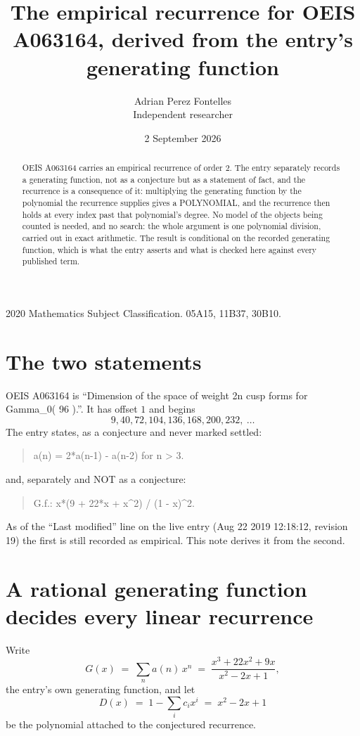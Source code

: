 \documentclass[11pt,a4paper]{article}
\title{The empirical recurrence for OEIS A063164, derived from the entry's generating function}
\author{Adrian Perez Fontelles\\ \small Independent researcher}
\date{2 September 2026}
\theoremstyle{plain}
\theoremstyle{definition}
\begin{document}
\maketitle

\begin{abstract}
OEIS A063164 carries an empirical recurrence of order $2$. The entry separately records a
generating function, not as a conjecture but as a statement of fact, and the recurrence is a
consequence of it: multiplying the generating function by the polynomial the recurrence
supplies gives a POLYNOMIAL, and the recurrence then holds at every index past that
polynomial's degree. No model of the objects being counted is needed, and no search: the
whole argument is one polynomial division, carried out in exact arithmetic. The result is
conditional on the recorded generating function, which is what the entry asserts and what is
checked here against every published term.
\end{abstract}

\noindent\small 2020 Mathematics Subject Classification. 05A15, 11B37, 30B10.\normalsize

\section{The two statements}

OEIS A063164 is ``Dimension of the space of weight 2n cusp forms for Gamma\_0( 96 ).''. It has offset $1$ and begins
\[
9, 40, 72, 104, 136, 168, 200, 232,\ \dots
\]
The entry states, as a conjecture and never marked settled:
\begin{quote}
a(n) = 2*a(n-1) - a(n-2) for n > 3.
\end{quote}
and, separately and NOT as a conjecture:
\begin{quote}
G.f.: x*(9 + 22*x + x\^{}2) / (1 - x)\^{}2.
\end{quote}
As of the ``Last modified'' line on the live entry (Aug 22 2019 12:18:12, revision 19) the first is still
recorded as empirical. This note derives it from the second.

\section{A rational generating function decides every linear recurrence}

Write
\[
G(x)\;=\;\sum_{n}a(n)\,x^{n}\;=\;\frac{x^{3} + 22 x^{2} + 9 x}{x^{2} - 2 x + 1},
\]
the entry's own generating function, and let
\[
D(x)\;=\;1-\sum_i c_i x^{i}\;=\;x^{2} - 2 x + 1
\]
be the polynomial attached to the conjectured recurrence.
\end{document}
